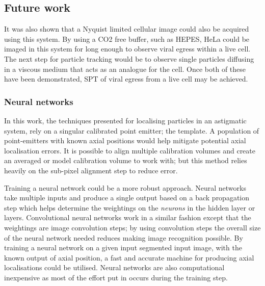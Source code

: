 \subsection{Future work}

It was also shown that a Nyquist limited cellular image could also be acquired using this system.
By using a CO2 free buffer, such as HEPES, HeLa could be imaged in this system for long enough to observe viral egress within a live cell.
The next step for particle tracking would be to observe single particles diffusing in a viscous medium that acts as an analogue for the cell.
Once both of these have been demonstrated, SPT of viral egress from a live cell may be achieved.

\subsubsection{Neural networks} %

In this work, the techniques presented for localising particles in an astigmatic system, rely on a singular calibrated point emitter; the template.
A population of point-emitters with known axial positions would help mitigate potential axial localisation errors.
It is possible to align multiple calibration volumes and create an averaged or model calibration volume to work with; but this method relies heavily on the sub-pixel alignment step to reduce error.

Training a neural network could be a more robust approach.
Neural networks take multiple inputs and produce a single output based on a back propagation step which helps determine the weightings on the \emph{neurons} in the hidden layer or layers.
Convolutional neural networks work in a similar fashion except that the weightings are image convolution steps; by using convolution steps the overall size of the neural network needed reduces making image recognition possible.
By training a neural network on a given input segmented input image, with the known output of axial position, a fast and accurate machine for producing axial localisations could be utilised.
Neural networks are also computational inexpensive as most of the effort put in occurs during the training step.


